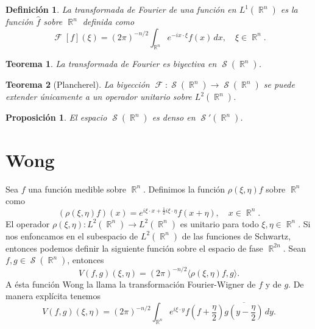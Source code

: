 \documentclass[a4paper]{report}
\DeclareMathOperator{\R}{\mathbb{R}}
\DeclareMathOperator{\Sz}{\mathcal S}
\DeclareMathOperator{\F}{\mathcal{F}}
\newtheorem{definition}{Definición}
\newtheorem{theorem}{Teorema}
\newtheorem{proposition}{Proposición}
\begin{document}
  \begin{definition}
    La transformada de Fourier de una función en
    $L^{1}(\R^{n})$ es la función $\hat{f}$ sobre $\R^{n}$ 
    definida como
    \[
      \F[f](\xi) = (2\pi)^{-n / 2} \int_{\R^{n}} e^{-i x
      \cdot \xi} f(x) \, dx, 
      \quad \xi \in \R^{n}.
    \] 
  \end{definition}

  \begin{theorem}
    La transformada de Fourier es biyectiva en
    $\Sz(\R^{n})$.
  \end{theorem}

  \begin{theorem}[Plancherel]
    La biyección $\F : \Sz(\R^{n}) \to \Sz(\R^{n})$ 
    se puede extender únicamente a un operador unitario
    sobre $L^2(\R^{n})$.
  \end{theorem}

  \begin{proposition}
    El espacio $\Sz(\R^{n})$ es denso en $\Sz'(\R^{n})$.
  \end{proposition}

  \section{Wong}

  Sea $f$ una función medible sobre $\R^{n}$. Definimos la
  función $\rho(\xi,\eta)f$ sobre $\R^{n}$ como
  \begin{equation}
    (\rho(\xi,\eta)f)(x)
    = e^{i\xi \cdot x + \frac{1}{2} i \xi \cdot \eta}
    f(x+\eta),
    \quad x \in \R^{n}.
  \end{equation}
  El operador $\rho(\xi,\eta) : L^2(\R^{n}) \to L^2(\R^{n})$
  es unitario para todo $\xi, \eta \in \R^{n}$. Si nos
  enfoncamos en el subespacio de $L^2(\R^{n})$ de las
  funciones de Schwartz, entonces podemos definir la
  siguiente función sobre el espacio de fase $\R^{2n}$. Sean
  $f,g \in \Sz(\R^{n})$, entonces
  \begin{equation}
    V(f,g)(\xi,\eta)
    = (2\pi)^{-n / 2} \langle \rho(\xi,\eta)f, g \rangle.
  \end{equation}
  A ésta función Wong la llama la transformación
  Fourier-Wigner de $f$ y de $g$. De manera explícita
  tenemos 
  \begin{equation}
    V(f,g)(\xi,\eta)
    = (2\pi)^{-n / 2} \int_{\R^{n}} e^{i \xi \cdot y}
    f\left( f + \frac{\eta}{2} \right) \overline{g\left( y -
    \frac{\eta}{2}\right) } \, dy.
  \end{equation}
\end{document}

